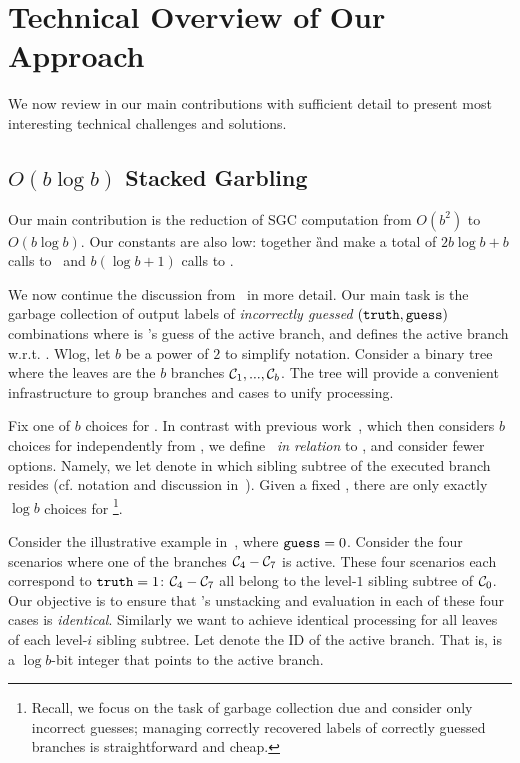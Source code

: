 
\section{Technical Overview of Our Approach}
\label{sec:techOverview}

We  now review in our main contributions with sufficient  detail to present most interesting  technical challenges and  solutions.

\subsection{$O(b\log b)$ Stacked Garbling}
\label{sec:techOverviewSG}

Our main contribution is the reduction of SGC computation
from $O(b^2)$ to $O(b \log b)$.  Our constants are also
low: together \G and \E make a total of $2 b \log b + b$ calls to \Gb\
and $b(\log b + 1)$ calls  to \Ev.

We now continue the discussion from~ in more detail.
Our main task is the garbage collection of output labels of {\em
incorrectly guessed} $(\mathtt{truth}, \mathtt{guess})$ combinations 
where
\guess is \E's guess of the active branch, and \truth defines the active branch w.r.t. \guess.
Wlog, let $b$ be a power of $2$ to simplify notation.
Consider a binary tree where the leaves are the $b$ branches $\mathcal C_1,...,\mathcal C_b$.  The tree will provide a convenient infrastructure to group branches and cases to unify processing.


Fix one of $b$ choices for \guess.  In contrast with previous work~\HK, which then considers $b$ choices for \truth independently from \guess, we define \truth\ {\em in relation} to \guess, and consider fewer \truth options.  Namely,
we  let \truth  denote in which sibling subtree of \guess the executed branch resides (cf. notation and discussion in~). 
Given a fixed \guess, there are only exactly  $\log b$ choices for \truth\footnote{Recall, we focus on the task of garbage collection due and consider only  incorrect guesses;  managing correctly recovered labels of correctly guessed branches is straightforward and cheap.}.

Consider the illustrative example in~, where $\mathtt{guess}=0$.
Consider the four scenarios where one of the branches $\mathcal C_4-\mathcal C_7$ is active.
These four scenarios each correspond
to $\mathtt{truth} = 1$: $\mathcal C_4-\mathcal C_7$ all belong to the level-$1$ sibling subtree of
$\mathcal C_0$.
%
Our objective is to ensure that \E's unstacking and evaluation in each
of these four cases is \emph{identical}.  Similarly we want to achieve identical processing for all leaves of each level-$i$ sibling subtree.
Let \aid denote the ID of the active branch. That is, \aid is a $\log
b$-bit integer that points to the active branch.


